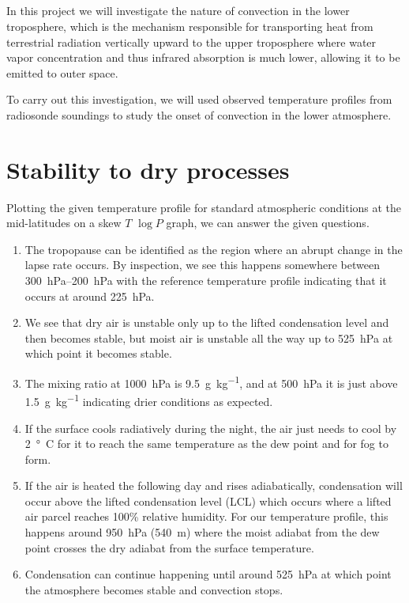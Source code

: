 \documentclass[11pt]{article}
\title{\spacedlowsmallcaps{\small 12.818: Introduction to Atmospheric Data and Large-scale Dynamics}\\ \spacedlowsmallcaps{\Large Project three: Convection and atmospheric thermodynamics}}
\author{\spacedlowsmallcaps{Ali Ramadhan}}
\date{}
\begin{document}
\maketitle

In this project we will investigate the nature of convection in the lower troposphere, which is the mechanism responsible for transporting heat from terrestrial radiation vertically upward to the upper troposphere where water vapor concentration and thus infrared absorption is much lower, allowing it to be emitted to outer space.

To carry out this investigation, we will used observed temperature profiles from radiosonde soundings to study the onset of convection in the lower atmosphere.

\section{Stability to dry processes}
Plotting the given temperature profile for standard atmospheric conditions at the mid-latitudes on a skew $T$ $\log P$ graph, we can answer the given questions.
\begin{enumerate}
	\item The tropopause can be identified as the region where an abrupt change in the lapse rate occurs. By inspection, we see this happens somewhere between \SIrange{300}{200}{\hecto\Pa} with the reference temperature profile indicating that it occurs at around \SI{225}{\hecto\Pa}.
	\item We see that dry air is unstable only up to the lifted condensation level and then becomes stable, but moist air is unstable all the way up to \SI{525}{\hecto\Pa} at which point it becomes stable.
	\item The mixing ratio at \SI{1000}{\hecto\Pa} is \SI{9.5}{\g\per\kg}, and at \SI{500}{\hecto\Pa} it is just above \SI{1.5}{\g\per\kg} indicating drier conditions as expected.
	\item If the surface cools radiatively during the night, the air just needs to cool by \SI{2}{\degree C} for it to reach the same temperature as the dew point and for fog to form.
	\item If the air is heated the following day and rises adiabatically, condensation will occur above the lifted condensation level (LCL) which occurs where a lifted air parcel reaches 100\% relative humidity. For our temperature profile, this happens around \SI{950}{\hecto\Pa} (\SI{540}{\m}) where the moist adiabat from the dew point crosses the dry adiabat from the surface temperature.
	\item Condensation can continue happening until around \SI{525}{\hecto\Pa} at which point the atmosphere becomes stable and convection stops.
\end{enumerate}
\end{document}
